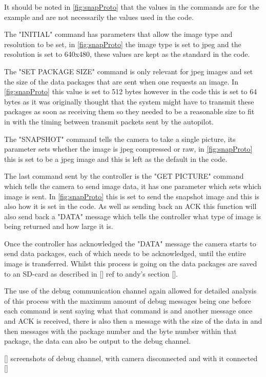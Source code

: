 It should be noted in \ref{fig:snapProto} that the values in the commands are for the example and are not necessarily the values used in the code.

The "INITIAL" command has parameters that allow the image type and resolution to be set, in \ref{fig:snapProto} the image type is set to jpeg and the resolution is set to 640x480, these values are kept as the standard in the code.

The "SET PACKAGE SIZE" command is only relevant for jpeg images and set the size of the data packages that are sent when one requests an image. In \ref{fig:snapProto} this value is set to 512 bytes however in the code this is set to 64 bytes as it was originally thought that the system might have to transmit these packages as soon as receiving them so they needed to be a reasonable size to fit in with the timing between transmit packets sent by the autopilot.

The "SNAPSHOT" command tells the camera to take a single picture, its parameter sets whether the image is jpeg compressed or raw, in \ref{fig:snapProto} this is set to be a jpeg image and this is left as the default in the code.

The last command sent by the controller is the "GET PICTURE" command which tells the camera to send image data, it has one parameter which sets which image is sent. In \ref{fig:snapProto} this is set to send the snapshot image and this is also how it is set in the code. As well as sending back an ACK this function will also send back a "DATA" message which tells the controller what type of image is being returned and how large it is.

Once the controller has acknowledged the "DATA" message the camera starts to send data packages, each of which needs to be acknowledged, until the entire image is transferred. Whilst this process is going on the data packages are saved to an SD-card as described in [] ref to andy's section [].

The use of the debug communication channel again allowed for detailed analysis of this process with the maximum amount of debug messages being one before each command is sent saying what that command is and another message once and ACK is received, there is also then a message with the size of the data in and then messages with the package number and the byte number within that package, the data can also be output to the debug channel.

[] screenshots of debug channel, with camera disconnected and with it connected []

